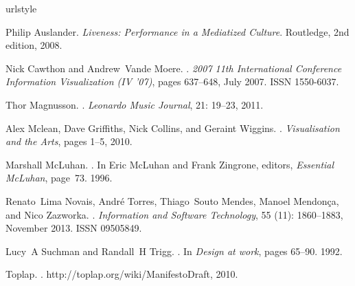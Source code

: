 \documentclass{sig-alternate}
\begin{document}
\enlargethispage{10pt}

% 


\begin{thebibliography}{8}
\providecommand{\natexlab}[1]{#1}
\providecommand{\url}[1]{\texttt{#1}}
\expandafter\ifx\csname urlstyle\endcsname\relax
  \providecommand{\doi}[1]{doi: #1}\else
  \providecommand{\doi}{doi: \begingroup \urlstyle{rm}\Url}\fi

\raggedright

Philip Auslander.
\newblock \emph{{Liveness: Performance in a Mediatized Culture}}.
\newblock Routledge, 2nd edition, 2008.

Nick Cawthon and Andrew~Vande Moere.
.
\newblock \emph{2007 11th International Conference Information Visualization
  (IV '07)}, pages 637--648, July 2007.
\newblock ISSN 1550-6037.

Thor Magnusson.
.
\newblock \emph{Leonardo Music Journal}, 21: 19--23, 2011.

Alex Mclean, Dave Griffiths, Nick Collins, and Geraint Wiggins.
.
\newblock \emph{Visualisation and the Arts}, pages 1--5, 2010.

Marshall McLuhan.
.
\newblock In Eric McLuhan and Frank Zingrone, editors, \emph{Essential
  McLuhan}, page~73. 1996.

Renato~Lima Novais, Andr\'{e} Torres, Thiago~Souto Mendes, Manoel Mendon\c{c}a,
  and Nico Zazworka.
.
\newblock \emph{Information and Software Technology}, 55
  (11): 1860--1883, November 2013.
\newblock ISSN 09505849.

Lucy~A Suchman and Randall~H Trigg.
.
\newblock In \emph{Design at work}, pages 65--90. 1992.

Toplap.
.
\newblock http://toplap.org/wiki/ManifestoDraft, 2010.

\end{thebibliography}
\end{document}
